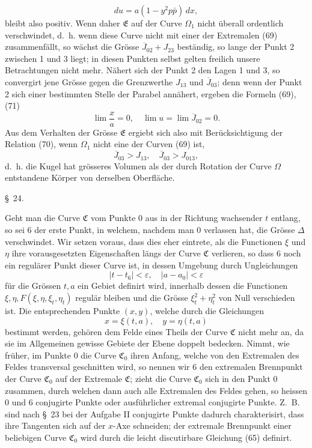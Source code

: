 \documentclass[11pt,a4paper,leqno]{article}
\begin{document}
\[
du=a(1-y^2p\bar{p})\,dx,
\]
bleibt also positiv. Wenn daher $\mathfrak{E}$ auf der Curve $\Omega_1$ nicht überall ordentlich verschwindet, d.~h. wenn diese Curve nicht mit einer der Extremalen (69) zusammenfällt, so wächst die Grösse $\overline{J}_{02}+J_{23}$ beständig, so lange der Punkt 2 zwischen 1 und 3 liegt; in diesen Punkten selbst gelten freilich unsere Betrachtungen nicht mehr. Nähert sich der Punkt 2 den Lagen 1 und 3, so convergirt jene Grösse gegen die Grenzwerthe $J_{13}$ und $\overline{J}_{03}$; denn wenn der Punkt 2 sich einer bestimmten Stelle der Parabel annähert, ergeben die Formeln (69), (71)
\[
\lim\frac{x}{a}=0,\quad \lim u=\lim\overline{J}_{02}=0.
\]
Aus dem Verhalten der Grösse $\mathfrak{E}$ ergiebt sich also mit Berücksichtigung der Relation (70), wenn $\Omega_1$ nicht eine der Curven (69) ist,
\[
\overline{J}_{03}>J_{13},\quad
\overline{J}_{03}>J_{013},
\]
d.~h. die Kugel hat grösseres Volumen als der durch Rotation der Curve $\Omega$ entstandene Körper von derselben Oberfläche.

\begin{center}{\large \S~24.}\end{center}

Geht man die Curve $\mathfrak{C}$ vom Punkte 0 aus in der Richtung wachsender $t$ entlang, so sei 6 der erste Punkt, in welchem, nachdem man 0 verlassen hat, die Grösse $\Delta$ verschwindet. Wir setzen voraus, dass dies eher eintrete, als die Functionen $\xi$ und $\eta$ ihre vorausgesetzten Eigenschaften längs der Curve $\mathfrak{C}$ verlieren, so dass 6 noch ein regulärer Punkt dieser Curve ist, in dessen Umgebung durch Ungleichungen
\[
|t-t_6|<\varepsilon,\quad |a-a_0|<\varepsilon
\]
für die Grössen $t,a$ ein Gebiet definirt wird, innerhalb dessen die Functionen $\xi,\eta,F(\xi,\eta,\xi_t,\eta_t)$ regulär bleiben und die Grösse $\xi_t^2+\eta_t^2$ von Null verschieden ist. Die entsprechenden Punkte $(x,y)$, welche durch die Gleichungen
\[
x=\xi(t,a),\quad y=\eta(t,a)
\]
bestimmt werden, gehören dem Felde eines Theils der Curve $\mathfrak{C}$ nicht mehr an, da sie im Allgemeinen gewisse Gebiete der Ebene doppelt bedecken. Nimmt, wie früher, im Punkte 0 die Curve $\mathfrak{C}_0$ ihren Anfang, welche von den Extremalen des Feldes transversal geschnitten wird, so nennen wir 6 den extremalen Brennpunkt der Curve $\mathfrak{C}_0$ auf der Extremale $\mathfrak{C}$; zieht die Curve $\mathfrak{C}_0$ sich in den Punkt 0 zusammen, durch welchen dann auch alle Extremalen des Feldes gehen, so heissen 0 und 6 conjugirte Punkte oder ausführlicher extremal conjugirte Punkte. Z.~B. sind nach \S~23 bei der Aufgabe II conjugirte Punkte dadurch charakterisirt, dass ihre Tangenten sich auf der $x$-Axe schneiden; der extremale Brennpunkt einer beliebigen Curve $\mathfrak{C}_0$ wird durch die leicht discutirbare Gleichung (65) definirt.
\end{document}
